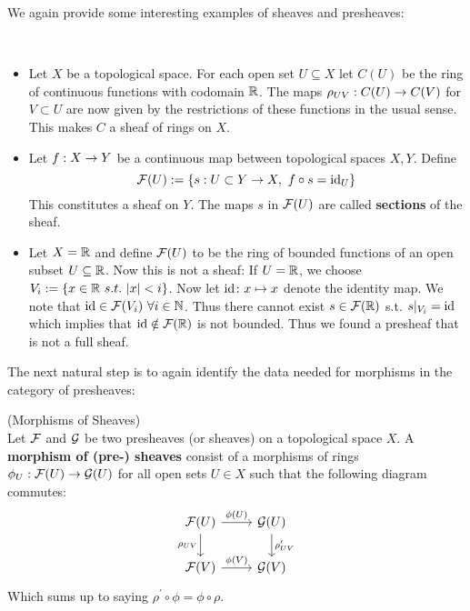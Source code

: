 We again provide some interesting examples of sheaves and presheaves:

\begin{example}~
\begin{itemize}
  \item Let $X$ be a topological space. For each open set $U\subseteq X$ let $C(U)$ be the ring of continuous functions with codomain $\mathbb{R}$. The maps $\rho_{UV}:C(U)\rightarrow C(V)$ for $V \subset U$ are now given by the restrictions of these functions in the usual sense. This makes $C$ a sheaf of rings on $X$.
  \item Let $f:X \rightarrow Y$ be a continuous map between topological spaces $X,Y$. Define
  \begin{equation}
    {\mathcal{F}}(U):=\{ s:U \subset Y \rightarrow X, \ f \circ s = \operatorname{id}_U \}
  \end{equation}
  This constitutes a sheaf on $Y$. The maps $s$ in ${\mathcal{F}}(U)$ are called \textbf{sections} of the sheaf.
  \item Let $X= \mathbb{R}$ and define ${\mathcal{F}}(U)$ to be the ring of bounded functions of an open subset $U\subseteq \mathbb{R}$. Now this is not a sheaf: If $U = \mathbb{R}$, we choose $V_i := \{x \in \mathbb{R} \ s.t. \ |x| <i \}$. Now let $\operatorname{id} \colon x \mapsto x$ denote the identity map. We note that $\operatorname{id} \in {\mathcal{F}}(V_i) \ \forall i \in \mathbb{N}$. Thus there cannot exist $s \in {\mathcal{F}}(\mathbb{R})$ s.t. $s|_{V_i} = \operatorname{id}$ which implies that $\operatorname{id} \notin {\mathcal{F}}(\mathbb{R})$ is not bounded. Thus we found a presheaf that is not a full sheaf.
\end{itemize}
\end{example}

The next natural step is to again identify the data needed for morphisms in the category of presheaves:

\begin{definition} (Morphisms of Sheaves)\\
  Let ${\mathcal{F}}$ and ${\mathcal{G}}$ be two presheaves (or sheaves) on a topological space $X$. A \textbf{morphism of (pre-) sheaves} consist of a morphisms of rings $\phi_U: \FF(U) \ra \GG(U)$ for all open sets $U \in X$ such that the following diagram commutes:
  \begin{equation}
  \begin{tikzcd}
    \FF(U) \arrow{r}{\phi(U)} \arrow[swap]{d}{\rho_{UV}} & \GG(U) \arrow{d}{\rho^\prime_{UV}} \\
    \FF(V) \arrow{r}{\phi(V)} & \GG(V)
  \end{tikzcd}
  \end{equation}
  Which sums up to saying $\rho^\prime \circ \phi = \phi \circ \rho$.
\end{definition}


